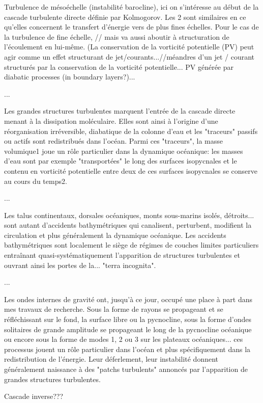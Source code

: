 Turbulence de mésoéchelle (instabilité barocline), ici on s'intéresse au début de la cascade turbulente directe définie par Kolmogorov. Les 2 sont similaires en ce qu'elles concernent le transfert d'énergie vers de plus fines échelles. Pour le cas de la turbulence de fine échelle, // mais va aussi aboutir à structuration de l'écoulement en lui-même. (La conservation de la vorticité potentielle (PV) peut agir comme un effet structurant de jet/courants...//méandres d'un jet / courant structurés par la conservation de la vorticité potentielle... PV générée par diabatic processes (in boundary layers?)...

...

Les grandes structures turbulentes marquent l'entrée de la cascade directe menant à la dissipation moléculaire. Elles sont ainsi à l'origine d'une réorganisation irréversible, diabatique de la colonne d'eau et les "traceurs" passifs ou actifs sont redistribués dans l'océan. Parmi ces "traceurs", la masse volumique1 joue un rôle particulier dans la dynamique océanique: les masses d'eau sont par exemple "transportées" le long des surfaces isopycnales et le contenu en vorticité potentielle entre deux de ces surfaces isopycnales se conserve au cours du temps2.

...

Les talus continentaux, dorsales océaniques, monts sous-marins isolés, détroits... sont autant d'accidents bathymétriques qui canalisent, perturbent, modifient la circulation et plus généralement la dynamique océanique. Les accidents bathymétriques sont localement le siège de régimes de couches limites particuliers entraînant quasi-systématiquement l'apparition de structures turbulentes et ouvrant ainsi les portes de la... "terra incognita".

...

Les ondes internes de gravité ont, jusqu'à ce jour, occupé une place à part dans mes travaux de recherche. Sous la forme de rayons se propageant et se réfléchissant sur le fond, la surface libre ou la pycnocline, sous la forme d'ondes solitaires de grande amplitude se propageant le long de la pycnocline océanique ou encore sous la forme de modes 1, 2 ou 3 sur les plateaux océaniques... ces processus jouent un rôle particulier dans l'océan et plus spécifiquement dans la redistribution de l'énergie. Leur déferlement, leur instabilité donnent généralement naissance à des "patchs turbulents" annoncés par l'apparition de grandes structures turbulentes.

Cascade inverse???

